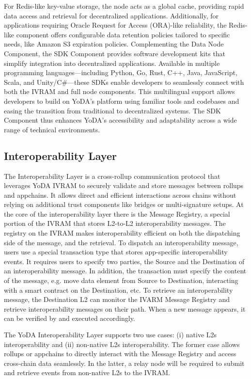\documentclass[11pt]{article}
\begin{document}
For Redis-like key-value storage, the node acts as a global cache, providing rapid data access and retrieval for decentralized applications. Additionally, for applications requiring Oracle Request for Access (ORA)-like reliability, the Redis-like component offers configurable data retention policies tailored to specific needs, like Amazon S3 expiration policies.
%
Complementing the Data Node Component, the SDK Component provides software development kits that simplify integration into decentralized applications. Available in multiple programming languages—including Python, Go, Rust, C++, Java, JavaScript, Scala, and Unity/C\#—these SDKs enable developers to seamlessly connect with both the IVRAM and full node components. This multilingual support allows developers to build on YoDA’s platform using familiar tools and codebases and easing the transition from traditional to decentralized systems. The SDK Component thus enhances YoDA's accessibility and adaptability across a wide range of technical environments.

\subsection{Interoperability Layer}
The Interoperability Layer is a cross-rollup communication protocol that leverages YoDA IVRAM to securely validate and store messages between rollups and appchains. It allows direct and efficient interactions across chains without relying on additional trust components like bridges or multi-signature setups.
%
At the core of the interoperability layer there is the Message Registry, a special portion of the IVRAM that stores L2-to-L2 interoperability messages. The registry on the IVRAM makes interoperability efficient on both the dispatching side of the message, and the retrieval.
%
To dispatch an interoperability message, users use a special transaction type that stores app-specific interoperability events. It requires users to specify two parties, the Source and the Destination of an interoperability message. In addition, the transaction must specify the content of the message, e.g. move data element from Source to Destination, interacting with a smart contract on the Destination, etc.  
%
To retrieve an interoperability message, the Destination L2 can monitor the IVARM Message Registry and retrieve interoperability messages on their path. When a new message appears, it can be verified by and executed accordingly.

The YoDA Interoperability Layer supports two use cases: (i) native L2s interoperability and (ii) non-native L2s interoperability. The former case allows rollups or appchains to directly interact with the Message Registry and access cross-chain data seamlessly. In the latter, a relay node will be required to submit and retrieve events from non-native L2s to the IVRAM.
\end{document}
